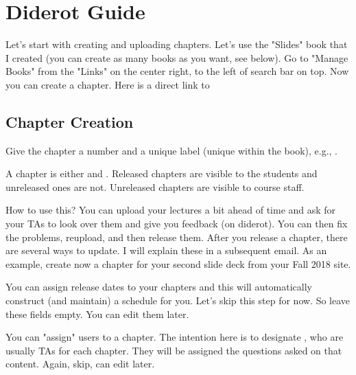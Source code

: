 \chapter{Diderot Guide}
\label{ch:guide}

Let's start with creating and uploading chapters.  Let's use the
"Slides" book that I created (you can create as many books as you
want, see below).  Go to "Manage Books" from the "Links" on the center
right, to the left of search bar on top.  Now you can create a
chapter.  Here is a direct link to 

\section{Chapter Creation}

\begin{gram}[Label]

Give the chapter a number and a unique label (unique within the book), e.g., .  

\end{gram}

\begin{gram}
A chapter is either  and . 
%
Released chapters are visible to the students and unreleased ones are not. Unreleased chapters are visible to course staff.  

How to use this? You can upload your lectures a bit ahead of time and ask for your TAs to look over them and give you feedback (on diderot).  You can then fix the problems, reupload, and then release them.  After you release a chapter, there are several ways to update.  I will explain these in a subsequent email.  As an example, create now a chapter for your second slide deck from your Fall 2018 site. 
\end{gram}

\begin{gram}  

You can assign release dates to your chapters and this will
automatically construct (and maintain) a schedule for you.  Let's skip
this step for now.  So leave these fields empty.  You can edit them
later.
\end{gram}


\begin{gram}[Assignments]
You can "assign" users to a chapter.  The intention here is to
designate , who are usually TAs for each
chapter. 
%
They will be assigned the questions asked on that content.
Again, skip, can edit later.
\end{gram}

